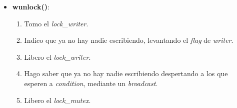 \begin{itemize}
\item \textbf{wunlock()}:
	\begin{enumerate}

	\item Tomo el \textit{lock\_writer}.
	\item Indico que ya no hay nadie escribiendo, levantando el \textit{flag} de \textit{writer}.
	\item Libero el \textit{lock\_writer}.
	\item Hago saber que ya no hay nadie escribiendo despertando a los que esperen a \textit{condition}, mediante un \textit{broadcast}.
	\item Libero el \textit{lock\_mutex}.
	\end{enumerate}

\end{itemize}


